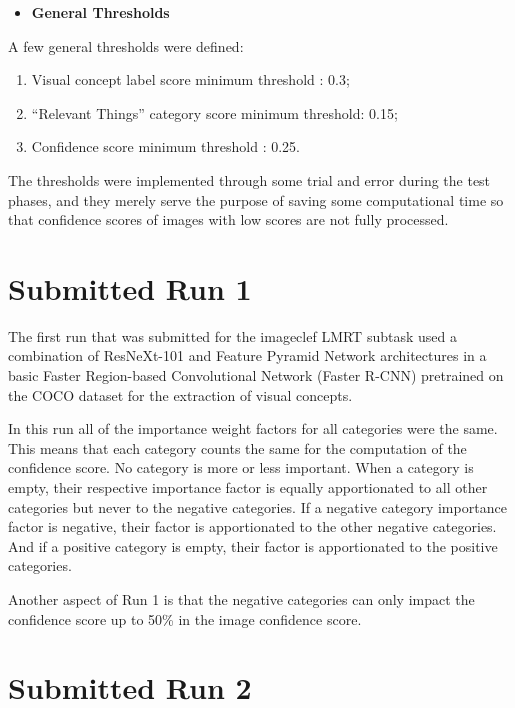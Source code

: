    \newpage
    \begin{itemize}
      \item \textbf{General Thresholds}
    \end{itemize}

    A few general thresholds were defined:

   \begin{enumerate}
    \item Visual concept label score minimum threshold : 0.3;
    \item \enquote{Relevant Things} category score  minimum threshold: 0.15;
    \item Confidence score minimum threshold  : 0.25.
   \end{enumerate}


   The thresholds were implemented through some trial and error during the test phases, and they merely serve the purpose of saving some computational time so that confidence scores of images with low scores are not fully processed. 



    \section{Submitted Run 1}
      \label{sec:run1}

    The first run that was submitted for the imageclef LMRT subtask used a combination of ResNeXt-101 and Feature Pyramid Network architectures in a basic Faster Region-based Convolutional Network (Faster R-CNN) pretrained on the COCO dataset for the extraction of visual concepts.

    In this run all of the importance weight factors for all categories were the same. This means that each category counts the same for the computation of the confidence score. No category is more or less important. When a category is empty, their respective importance factor is equally apportionated to all other categories but never to the negative categories. If a negative category importance factor is negative, their factor is apportionated to the other negative categories. And if a positive category is empty, their factor is apportionated to the positive categories.

    Another aspect of Run 1 is that the negative categories can only impact the confidence score up to 50\% in the image confidence score.
    
 

    \section{Submitted Run 2}
    \label{sec:run2}
    
